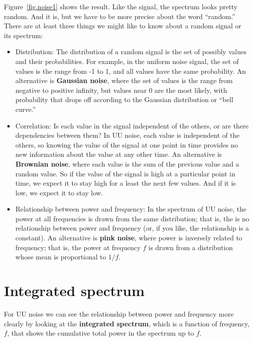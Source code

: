 \documentclass[12pt]{book}
\begin{document}
Figure~\ref{fig.noise1} shows the result.  Like the signal, the
spectrum looks pretty random.  And it is, but we have to be more
precise about the word ``random.''  There are at least three things we
might like to know about a random signal or its spectrum:

\begin{itemize}

\item Distribution: The distribution of a random signal is the set of
  possibly values and their probabilities.  For example, in the
  uniform noise signal, the set of values is the range from -1 to 1,
  and all values have the same probability.  An alternative is
  {\bf Gaussian noise}, where the set of values is the range from negative
  to positive infinity, but values near 0 are the most likely, with
  probability that drops off according to the Gaussian distribution or
  ``bell curve.''

\item Correlation: Is each value in the signal independent of the
  others, or are there dependencies between them?  In UU noise, each
  value is independent of the others, so knowing the value of the
  signal at one point in time provides no new information about the
  value at any other time.  An alternative is {\bf Brownian noise},
  where each value is the sum of the previous value and a random
  value.  So if the value of the signal is high at a particular point
  in time, we expect it to stay high for a least the next few values.
  And if it is low, we expect it to stay low.

\item Relationship between power and frequency: In the spectrum of UU
  noise, the power at all frequencies is drawn from the same
  distribution; that is, the is no relationship between power and
  frequency (or, if you like, the relationship is a constant).  An
  alternative is {\bf pink noise}, where power is inversely related
  to frequency; that is, the power at frequency $f$ is drawn from
  a distribution whose mean is proportional to $1/f$.

\end{itemize}


\section{Integrated spectrum}

For UU noise we can see the relationship between power and frequency
more clearly by looking at the {\bf integrated spectrum}, which
is a function of frequency, $f$, that shows the cumulative total power in
the spectrum up to $f$.
\end{document}
